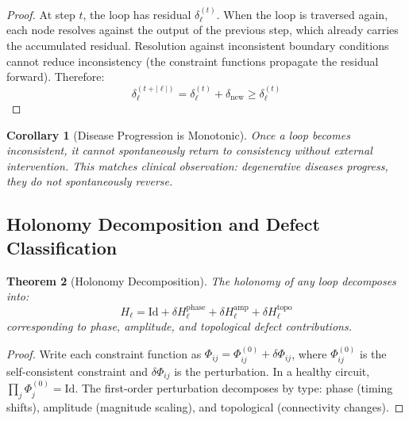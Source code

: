 \documentclass[10pt,twocolumn,a4paper]{article}
\theoremstyle{plain}
\newtheorem{theorem}{Theorem}[section]
\newtheorem{corollary}[theorem]{Corollary}
\theoremstyle{definition}
\theoremstyle{remark}
\begin{document}
\begin{proof}
At step $t$, the loop has residual $\delta_\ell^{(t)}$. When the loop is traversed again, each node resolves against the output of the previous step, which already carries the accumulated residual. Resolution against inconsistent boundary conditions cannot reduce inconsistency (the constraint functions propagate the residual forward). Therefore:
\begin{equation}
    \delta_\ell^{(t+|\ell|)} = \delta_\ell^{(t)} + \delta_{\mathrm{new}} \geq \delta_\ell^{(t)}
\end{equation}
\end{proof}

\begin{corollary}[Disease Progression is Monotonic]
\label{cor:progression}
Once a loop becomes inconsistent, it cannot spontaneously return to consistency without external intervention. This matches clinical observation: degenerative diseases progress, they do not spontaneously reverse.
\end{corollary}

\subsection{Holonomy Decomposition and Defect Classification}

\begin{theorem}[Holonomy Decomposition]
\label{thm:holonomy_decomp}
The holonomy of any loop decomposes into:
\begin{equation}
    H_\ell = \mathrm{Id} + \delta H_\ell^{\mathrm{phase}} + \delta H_\ell^{\mathrm{amp}} + \delta H_\ell^{\mathrm{topo}}
\end{equation}
corresponding to phase, amplitude, and topological defect contributions.
\end{theorem}

\begin{proof}
Write each constraint function as $\Phi_{ij} = \Phi_{ij}^{(0)} + \delta\Phi_{ij}$, where $\Phi_{ij}^{(0)}$ is the self-consistent constraint and $\delta\Phi_{ij}$ is the perturbation. In a healthy circuit, $\prod_j \Phi_j^{(0)} = \mathrm{Id}$. The first-order perturbation decomposes by type: phase (timing shifts), amplitude (magnitude scaling), and topological (connectivity changes).
\end{proof}
\end{document}
